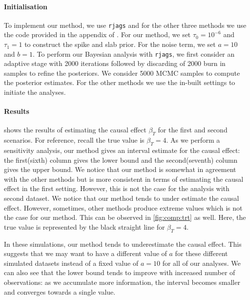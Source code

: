 \documentclass[preprint,12pt]{elsarticle}
\begin{document}
\paragraph{Initialisation} 
To implement our method, we use \texttt{rjags} and for the other three
methods we use the code provided in the appendix of \citep{koch2020}.
For our method, we set $\tau_0=10^{-6}$ and $\tau_1=1$ to construct the
spike and slab prior.
For the noise term, we set $a=10$ and $b=1$.
To perform 
our Bayesian analysis with \texttt{rjags}, we first consider an adaptive 
stage with 2000 iterations followed by discarding of 2000 burn in samples 
to refine the posteriors. We consider 5000 MCMC samples to compute the
posterior estimates. For the other methods we use the in-built settings 
to initiate the analyses.

\paragraph{Results}
 shows the results of estimating the causal effect $\beta_T$
for the first and second scenarios.
For reference, recall the true value is $\beta_T=4$. 
As we perform a sensitivity analysis,
our method gives an interval estimate for the causal effect:
the first(sixth) column gives the lower bound
and the second(seventh) column gives the upper bound. We notice that our method is 
somewhat in agreement with the other methods but is more consistent
in terms of estimating the causal effect in the first setting. However, this is not the
case for the analysis with second dataset. We notice that our method tends to under
estimate the causal effect. However, sometimes, other methods produce extreme 
values which is not the case for our method. This can be observed in \cref{fig:comp:trt} as well. Here, the true 
value is represented by the black straight line for $\beta_T = 4$. 

In these simulations, our method tends
to underestimate the causal effect.
This suggests that
we may want to have a different value of $a$ for these different simulated datasets
instead of a fixed value of $a=10$ for all of our analyses.
We can also see that the lower bound tends to improve
with increased number of observations: as we accumulate
more information, the interval becomes smaller and converges towards
a single value.
\end{document}
